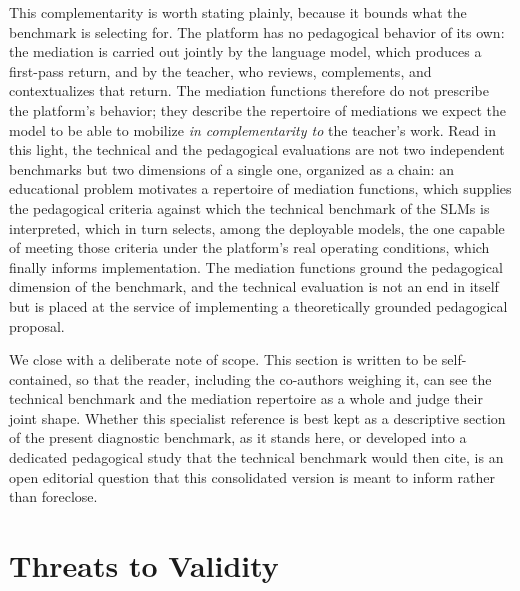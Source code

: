 \documentclass{sbc2023}%
\begin{document}
This complementarity is worth stating plainly, because it bounds what the benchmark is selecting for. The platform has no pedagogical behavior of its own: the mediation is carried out jointly by the language model, which produces a first-pass return, and by the teacher, who reviews, complements, and contextualizes that return. The mediation functions therefore do not prescribe the platform's behavior; they describe the repertoire of mediations we expect the model to be able to mobilize \textit{in complementarity to} the teacher's work. Read in this light, the technical and the pedagogical evaluations are not two independent benchmarks but two dimensions of a single one, organized as a chain: an educational problem motivates a repertoire of mediation functions, which supplies the pedagogical criteria against which the technical benchmark of the SLMs is interpreted, which in turn selects, among the deployable models, the one capable of meeting those criteria under the platform's real operating conditions, which finally informs implementation. The mediation functions ground the pedagogical dimension of the benchmark, and the technical evaluation is not an end in itself but is placed at the service of implementing a theoretically grounded pedagogical proposal.

We close with a deliberate note of scope. This section is written to be self-contained, so that the reader, including the co-authors weighing it, can see the technical benchmark and the mediation repertoire as a whole and judge their joint shape. Whether this specialist reference is best kept as a descriptive section of the present diagnostic benchmark, as it stands here, or developed into a dedicated pedagogical study that the technical benchmark would then cite, is an open editorial question that this consolidated version is meant to inform rather than foreclose.

\section{Threats to Validity}
\label{sec:threats}
\end{document}
